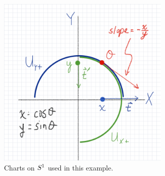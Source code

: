 \documentclass[11pt]{article}
\begin{document}
\begin{figure}[h]
\centerline{\includegraphics[height=3.25in,angle=0]{figs/Ex.VII.2.3_1_PHM.png}}
\caption{\small{Charts on $\protect S^1$ used in this example.}}
\label{Fig:defns}
\end{figure}
\end{document}
